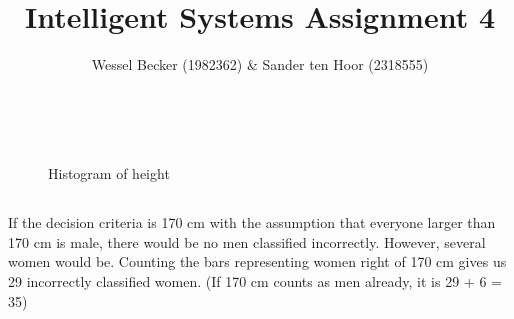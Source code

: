 \documentclass[10pt,a4paper]{article}
\begin{document}
\title{Intelligent Systems Assignment 4}
\author{Wessel Becker (1982362) \& Sander ten Hoor (2318555)}
\maketitle

\section{}
\subsection{}
\begin{figure}[H]
  \centering
     \\
  \caption{Histogram of height}
  \label{fig:1_1}
\end{figure}

\subsection{}
If the decision criteria is 170 cm with the assumption that everyone larger than 170 cm is male, there would be no men classified incorrectly. However, several women would be. Counting the bars representing women right of 170 cm gives us 29 incorrectly classified women.
(If 170 cm counts as men already, it is 29 + 6 = 35)
\end{document}
